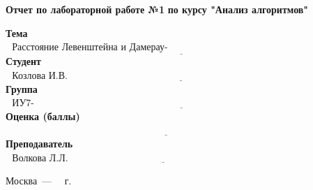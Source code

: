 \begin{titlepage}
	
	\begin{center}
		\Large\textbf{Отчет по лабораторной работе №1}
		\Large\textbf {по курсу "Анализ алгоритмов"}\newline
	\end{center}
	
	\noindent\textbf{Тема} $\underline{\text{~~Расстояние Левенштейна и Дамерау-Левенштейна~~~~~~~~~~~~~~~~~~~~~~~~~~~~~~~~~~~~~~~~~~~}}$\newline\newline\newline
	\noindent\textbf{Студент} $\underline{\text{~~Козлова И.В.~~~~~~~~~~~~~~~~~~~~~~~~~~~~~~~~~~~~~~~~~~~~~~~~~~~~~~~~~~~~~~~~~~~~~~~~~~~~~~~~~~~~~~~~~}}$\newline\newline
	\noindent\textbf{Группа} $\underline{\text{~~ИУ7-52Б~~~~~~~~~~~~~~~~~~~~~~~~~~~~~~~~~~~~~~~~~~~~~~~~~~~~~~~~~~~~~~~~~~~~~~~~~~~~~~~~~~~~~~~~~~~~~~~~~}}$\newline\newline
	\noindent\textbf{Оценка (баллы)} $\underline{\text{~~~~~~~~~~~~~~~~~~~~~~~~~~~~~~~~~~~~~~~~~~~~~~~~~~~~~~~~~~~~~~~~~~~~~~~~~~~~~~~~~~~~~~~~~~~~~~~~~~~}}$\newline\newline
	\noindent\textbf{Преподаватель} $\underline{\text{~~Волкова Л.Л.~~~~~~~~~~~~~~~~~~~~~~~~~~~~~~~~~~~~~~~~~~~~~~~~~~~~~~~~~~~~~~~~~~~~~~~~~~~~~~}}$\newline
	
	\begin{center}
		\vfill
		Москва~---~\the\year
		~г.
	\end{center}
	\restoregeometry
\end{titlepage}

